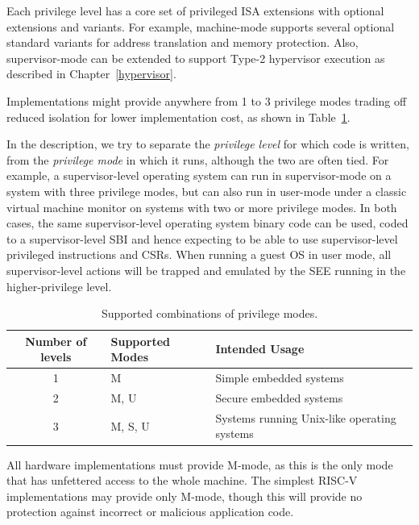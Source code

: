Each privilege level has a core set of privileged ISA extensions with
optional extensions and variants.  For example, machine-mode supports
several optional standard variants for address translation and memory
protection.  Also, supervisor-mode can be extended to support Type-2
hypervisor execution as described in Chapter~\ref{hypervisor}.

Implementations might provide anywhere from 1 to 3 privilege modes
trading off reduced isolation for lower implementation cost, as shown
in Table~\ref{privcombs}.

\begin{commentary}
In the description, we try to separate the {\em privilege level} for
which code is written, from the {\em privilege mode} in which it runs,
although the two are often tied.  For example, a supervisor-level
operating system can run in supervisor-mode on a system with three
privilege modes, but can also run in user-mode under a classic virtual
machine monitor on systems with two or more privilege modes.  In both
cases, the same supervisor-level operating system binary code can be
used, coded to a supervisor-level SBI and hence expecting to be able
to use supervisor-level privileged instructions and CSRs.  When
running a guest OS in user mode, all supervisor-level actions will be
trapped and emulated by the SEE running in the higher-privilege level.
\end{commentary}

\begin{table}[h!]
\begin{center}
\begin{tabular}{|c|l|l|}
  \hline
   Number of levels &  Supported Modes & Intended Usage \\ \hline  
   1     & M          & Simple embedded systems \\ 
   2     & M, U       & Secure embedded systems \\ 
   3     & M, S, U    & Systems running Unix-like operating systems\\ 
  \hline
 \end{tabular}
\end{center}
\caption{Supported combinations of privilege modes.}
\label{privcombs}
\end{table}

All hardware implementations must provide M-mode, as this is the only
mode that has unfettered access to the whole machine.  The simplest
RISC-V implementations may provide only M-mode, though this will
provide no protection against incorrect or malicious application code.

